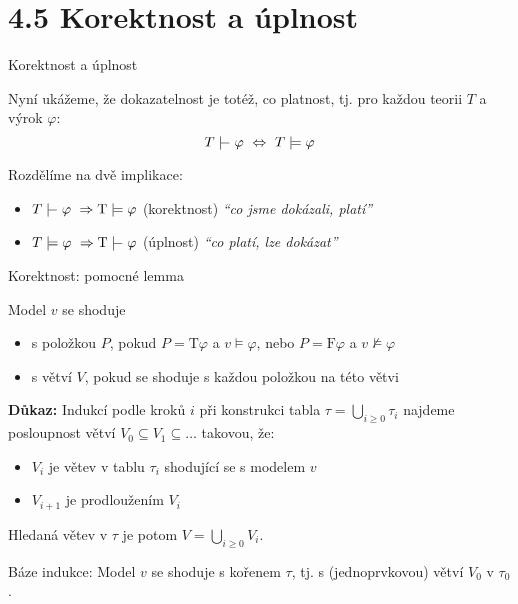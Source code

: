 \documentclass{beamer}
\begin{document}
\section{4.5 Korektnost a úplnost}


\begin{frame}{Korektnost a úplnost}
    
    Nyní ukážeme, že \alert{dokazatelnost} je totéž, co \alert{platnost}, tj. pro každou teorii $T$ a výrok $\varphi$:
    \alert{
    $$
    T\proves\varphi\ \Leftrightarrow\ T\models\varphi
    $$
    }

    Rozdělíme na dvě implikace: 
    
    \begin{itemize}
        \item \alert{$T\proves\varphi\ \Rightarrow\T\models\varphi$} \hspace{0.5cm} (korektnost) \hfill {\it``co jsme dokázali, platí''}
        \item\alert{$T\models\varphi\ \Rightarrow\T\proves\varphi$}  \hspace{0.5cm} (úplnost) \hfill {\it ``co platí, lze dokázat''}
    \end{itemize} 
 
\end{frame}


\begin{frame}{Korektnost: pomocné lemma}


    Model $v$ se \alert{shoduje}
    \begin{itemize}
        \item \alert{s položkou $P$}, pokud
        $P=\mathrm{T}\varphi$ a $v\models\varphi$, nebo $P=\mathrm{F}\varphi$ a $v\not\models\varphi$
        \item \alert{s větví $V$}, pokud se shoduje s každou položkou na této větvi
    \end{itemize}
    
    \medskip


    \smallskip
    
    \textbf{Důkaz:}
    Indukcí podle kroků $i$ při konstrukci tabla $\tau=\bigcup_{i\geq 0}\tau_i$ najdeme posloupnost větví $V_0\subseteq V_1\subseteq\dots$ takovou, že:
     \begin{itemize}
        \item $V_i$ je větev v tablu $\tau_i$ shodující se s modelem $v$
        \item $V_{i+1}$ je prodloužením $V_i$
     \end{itemize}
    Hledaná větev v $\tau$ je potom $V=\bigcup_{i\geq 0}V_i$.
    
    \alert{Báze indukce:} Model $v$ se shoduje s kořenem $\tau$, tj. s (jednoprvkovou) větví $V_0$ v $\tau_0$.

\end{frame}
\end{document}
